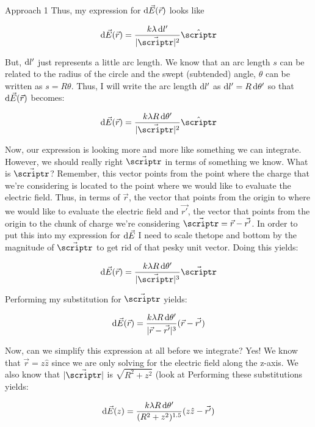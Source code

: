 \begin{homeworkProblem}
\begin{homeworkSection}{Approach 1}
        Thus, my expression for $\mathop{}\!\mathrm{d} \vec{E}(\vec{r})$ looks like
        
        \[ \diff \vec{E}(\vec{r}) = \frac{k \lambda \diff l'}{|\vec{\scriptr}|^2}
        \hat{\scriptr} \]

        But, $\mathop{}\!\mathrm{d} l'$ just represents a little arc length. We know
        that an arc length $s$ can be related to the radius of the
        circle and the swept (subtended) angle, $\theta$ can be written
        as $s = R \theta$. Thus, I will write the arc length $\mathop{}\!\mathrm{d} l'$
        as $\mathop{}\!\mathrm{d} l' = R \mathop{}\!\mathrm{d} \theta'$ so that $\mathop{}\!\mathrm{d} \vec{E}(\vec{r})$
        becomes:


        \[ \diff \vec{E}(\vec{r}) = \frac{k \lambda R \diff
        \theta'}{|\vec{\scriptr}|^2} \hat{\scriptr} \]

        Now, our expression is looking more and more like something we
        can integrate. However, we should really right $\vec{\scriptr}$
        in terms of something we know. What is $\vec{\scriptr}$?
        Remember, this vector points from the point where the charge
        that we're considering is located to the point where we would
        like to evaluate the electric field. Thus, in terms of
        $\vec{r}$, the vector that points from the origin to where we
        would like to evaluate the electric field and $\vec{r'}$, the
        vector that points from the origin to the chunk of charge we're
        considering $\vec{\scriptr} = \vec{r}-\vec{r'}$. In order to put
        this into my expression for $\mathop{}\!\mathrm{d} \vec{E}$ I need to scale
        thetope and bottom by the magnitude of $\vec{\scriptr}$ to get
        rid of that pesky unit vector. Doing this yields:
        
        \[ \diff \vec{E}(\vec{r}) = \frac{k \lambda R \diff
        \theta'}{|\vec{\scriptr}|^3} \vec{\scriptr} \]

        Performing my substitution for $\vec{\scriptr}$ yields:

        \[ \mathop{}\!\mathrm{d} \vec{E}(\vec{r}) = \frac{k \lambda R \mathop{}\!\mathrm{d}
        \theta'}{|\vec{r}-\vec{r'}|^3} (\vec{r} - \vec{r'}) \]

        Now, can we simplify this expression at all before we integrate?
        Yes! We know that $\vec{r} = z \hat{z}$ since we are only
        solving for the electric field along the z-axis. We also know
        that $|\vec{\scriptr}|$ is $\sqrt{R^2+z^2}$ (look at %
        Performing these substitutions yields:

        \[ \mathop{}\!\mathrm{d} \vec{E}(z) = \frac{k \lambda R \mathop{}\!\mathrm{d}
        \theta'}{(R^2+z^2)^{1.5}} (z \hat{z}- \vec{r'}) \]


\end{homeworkSection}
\end{homeworkProblem}
